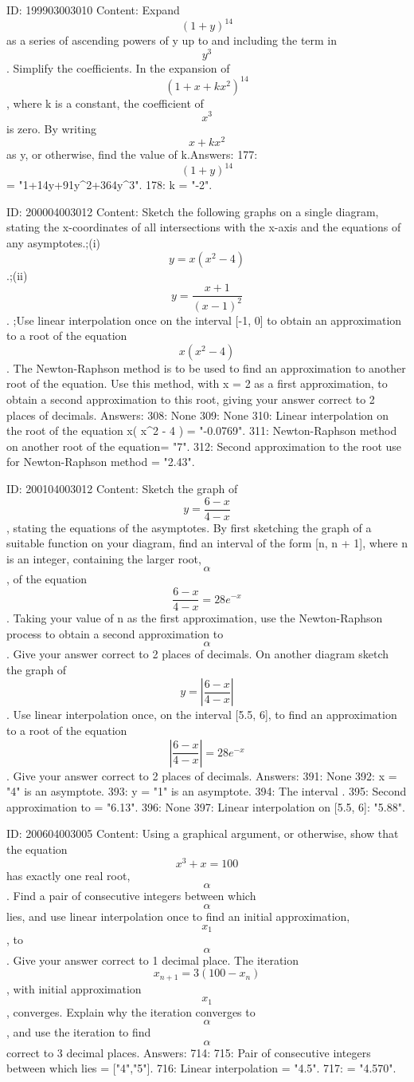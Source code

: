 \documentclass{article}
\begin{document}
ID: 199903003010
Content:
Expand \[(1 + y)^{14}\] as a series of ascending powers of y up to and including the term in \[y^3\]. Simplify the coefficients. In the expansion of \[(1 + x + kx^2)^{14}\], where k is a constant, the coefficient of \[x^3\] is zero. By writing \[x + kx^2\] as y, or otherwise, find the value of k.Answers:
177: \[(1 + y)^{14}\] = "1+14y+91y^2+364y^3".
178: k = "-2".

ID: 200004003012
Content:
Sketch the following graphs on a single diagram, stating the x-coordinates of all intersections with the x-axis and the equations of any asymptotes.;(i)  $$y = x( x^2  - 4 )$$.;(ii)  $$y = \frac{x + 1}{(x - 1)^2} $$. ;Use linear interpolation once on the interval [-1, 0] to obtain an approximation to a root of the equation  $$x( x^2  - 4 )$$. The Newton-Raphson method is to be used to find an approximation to another root of the equation. Use this method, with x = 2 as a first approximation, to obtain a second approximation to this root, giving your   answer correct to 2 places of decimals.  Answers:
308: None
309: None
310: Linear interpolation on the root of the equation x( x^2  - 4 ) = "-0.0769".
311: Newton-Raphson method on another root of the equation= "7".
312: Second approximation to the root use for Newton-Raphson method = "2.43".

ID: 200104003012
Content:
Sketch the graph of  $$y = \frac{6 - x}{4 - x}$$, stating the equations of the asymptotes. By first sketching the graph of a suitable function on your diagram, find an interval of the form [n, n + 1], where n is an integer, containing the larger root,  $$\alpha $$, of the equation  $$\frac{6 - x}{4 - x} = 28e^{- x} $$. Taking your value of n as the first approximation, use the Newton-Raphson process to obtain a second approximation to  $$\alpha $$. Give your answer correct to 2 places of decimals. On another diagram sketch the graph of  $$y = \left| \frac{6 - x}{4 - x} \right|$$. Use linear interpolation once, on the interval [5.5, 6], to find an approximation to a root of the equation  $$\left| \frac{6 - x}{4 - x}\right| = 28e^{- x}$$. Give your answer correct to 2 places of decimals.  Answers:
391: None
392: x = "4" is an asymptote.
393: y = "1" is an asymptote.
394: The interval \alpha \in ["6","7"].
395: Second approximation to \alpha = "6.13".
396: None
397: Linear interpolation on [5.5, 6]: \beta \approx "5.88".

ID: 200604003005
Content:
Using a graphical argument, or otherwise, show that the equation  $$x^3  + x = 100$$ has exactly one real root,  $$\alpha $$. Find a pair of consecutive integers between which  $$\alpha $$ lies, and use linear interpolation once to find an initial approximation,  $$x_1 $$, to  $$\alpha $$. Give your answer correct to 1 decimal place. The iteration  $$x_{n + 1}  = 3 ( 100 - x_n ) $$, with initial approximation  $$x_1 $$, converges. Explain why the iteration converges to  $$\alpha $$, and use the iteration to find  $$\alpha $$ correct to 3 decimal places. Answers:
714: 
715: Pair of consecutive integers between which  \alpha  lies = ["4","5"].
716: Linear interpolation = "4.5".
717: \alpha = "4.570".
\end{document}
